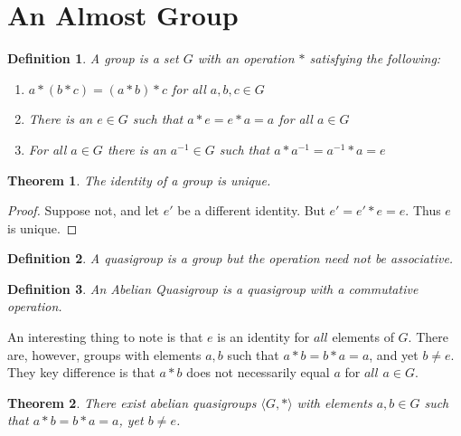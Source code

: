 \documentclass[crop=false,class=book]{standalone}
\theoremstyle{mystyle}
\newtheorem{theorem}{Theorem}[section]
\newtheorem{definition}{Definition}[section]
\begin{document}
\section{An Almost Group}
\begin{definition}
A group is a set $G$ with an operation $*$ satisfying the following:
\begin{enumerate}
    \item $a*(b*c) = (a*b)*c$ for all $a,b,c\in G$
    \item There is an $e\in G$ such that $a*e=e*a = a$ for all $a\in G$
    \item For all $a\in G$ there is an $a^{-1}\in G$ such that $a*a^{-1}=a^{-1}*a = e$
\end{enumerate}
\end{definition}
\begin{theorem}
The identity of a group is unique.
\end{theorem}
\begin{proof}
Suppose not, and let $e'$ be a different identity. But $e' = e'*e = e$. Thus $e$ is unique.
\end{proof}
\begin{definition}
A quasigroup is a group but the operation need not be associative.
\end{definition}
\begin{definition}
An Abelian Quasigroup is a quasigroup with a commutative operation.
\end{definition}
An interesting thing to note is that $e$ is an identity for $all$ elements of $G$. There are, however, groups with elements $a,b$ such that $a*b = b*a = a$, and yet $b\ne e$. They key difference is that $a*b$ does not necessarily equal $a$ for $all$ $a\in G$. 
\begin{theorem}
There exist abelian quasigroups $\langle G,*\rangle$ with elements $a,b\in G$ such that $a*b = b*a = a$, yet $b\ne e$.
\end{theorem}
\end{document}
